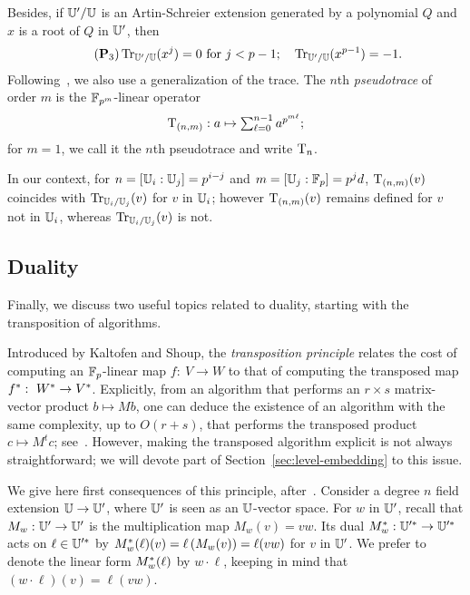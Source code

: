 Besides, if $\mathbb{U}'/\mathbb{U}$ is an Artin-Schreier extension generated by a
polynomial $Q$ and $x$ is a root of $Q$ in $\mathbb{U}'$, then
\begin{equation}
  \tag{$\bP_3$}\label{eq:pd} \Tr_{\U'/\U}(x^j) = 0~ \text{for}~j
  <p-1; \quad \Tr_{\U'/\U}(x^{p-1}) = -1\text{.}
\end{equation}
Following~\cite{Couveignes00}, we also use a generalization of the
trace. The $n$th {\em pseudotrace} of order $m$ is the
$\mathbb{F}_{p^m}$-linear operator
\begin{equation*}
\begin{array}{c}  \operatorname{T}_{(n,m)}: a \mapsto \sum_{\ell=0}^{n-1}a^{p^{m\ell}};\end{array}
\end{equation*}
for $m=1$, we call it the $n$th pseudotrace and write $\operatorname{T}_n$.

In our context, for $n=[\mathbb{U}_i:\mathbb{U}_j]=p^{i-j}$ and $m=[\mathbb{U}_j:\mathbb{F}_p]=p^jd$,
$\operatorname{T}_{(n,m)}(v)$ coincides with $\operatorname{Tr}_{\mathbb{U}_{i}/\mathbb{U}_j}(v)$ for $v$ in
$\mathbb{U}_i$; however $\operatorname{T}_{(n,m)}(v)$ remains defined for $v$ not in
$\mathbb{U}_i$, whereas $\operatorname{Tr}_{\mathbb{U}_{i}/\mathbb{U}_j}(v)$ is not.


\subsection{Duality}\label{ssec:duality}

Finally, we discuss two useful topics related to duality,
starting with the transposition of algorithms.

Introduced by Kaltofen and Shoup, the \emph{transposition principle}
relates the cost of computing an $\mathbb{F}_p$-linear map $f:\ V \to W$ to
that of computing the transposed map $f^\ast:\ W^\ast \to
V^\ast$.  Explicitly, from an algorithm that performs an $r \times
s$ matrix-vector product $b \mapsto M b$, one can deduce the existence
of an algorithm with the same complexity, up to $O(r+s)$, that
performs the transposed product $c \mapsto M^t c$;
see~\cite{BuClSh97,Kaltofen00,BoLeSc03}. However, making the
transposed algorithm explicit is not always straightforward; we will
devote part of Section~\ref{sec:level-embedding} to this issue.

We give here first consequences of this principle,
after~\cite{Sho94,Shoup99,BoLeSc03}. Consider a degree $n$ field
extension $\mathbb{U} \to \mathbb{U}'$, where $\mathbb{U}'$ is seen as an $\mathbb{U}$-vector
space. For $w$ in $\mathbb{U}'$, recall that $M_w: \mathbb{U}'\rightarrow\mathbb{U}'$ is the
multiplication map $M_w(v) = vw$.  Its dual $M_w^\ast: \mathbb{U}'^\ast
\rightarrow \mathbb{U}'^\ast$ acts on $\ell\in\mathbb{U}'^\ast$ by
$M_w^\ast(\ell)(v) = \ell\left(M_w(v)\right) = \ell(vw)$ for $v$ in
$\mathbb{U}'$. We prefer to denote the linear form $M_w^\ast(\ell)$ by
$w\cdot\ell$, keeping in mind that $(w\cdot\ell)(v) = \ell(vw)$.

